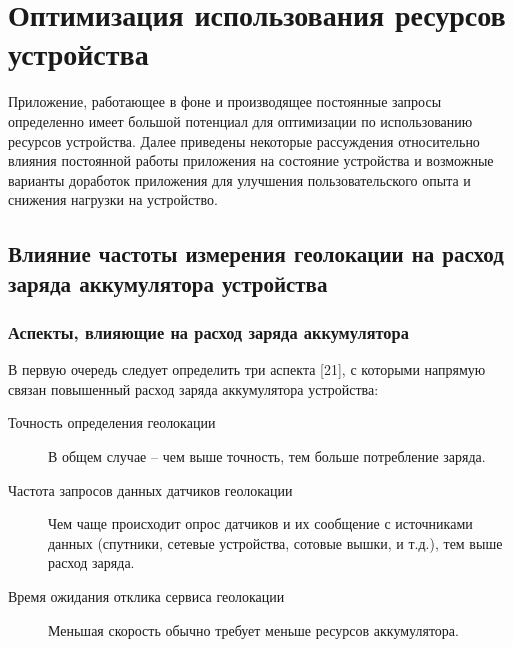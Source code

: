 \chapter{Оптимизация использования ресурсов устройства}
Приложение, работающее в фоне и производящее постоянные запросы определенно имеет большой потенциал для оптимизации по использованию ресурсов устройства. Далее приведены некоторые рассуждения относительно влияния постоянной работы приложения на состояние устройства и возможные варианты доработок приложения для улучшения пользовательского опыта и снижения нагрузки на устройство.

\section{Влияние частоты измерения геолокации на расход заряда аккумулятора устройства}
\subsection{Аспекты, влияющие на расход заряда аккумулятора}
В первую очередь следует определить три аспекта [21], с которыми напрямую связан повышенный расход заряда аккумулятора устройства:
\begin{description}
	\item[Точность определения геолокации] В общем случае – чем выше точность, тем больше потребление заряда.
	\item[Частота запросов данных датчиков геолокации] Чем чаще происходит опрос датчиков и их сообщение с источниками данных (спутники, сетевые устройства, сотовые вышки, и т.д.), тем выше расход заряда.
	\item[Время ожидания отклика сервиса геолокации] Меньшая скорость обычно требует меньше ресурсов аккумулятора.
\end{description}

